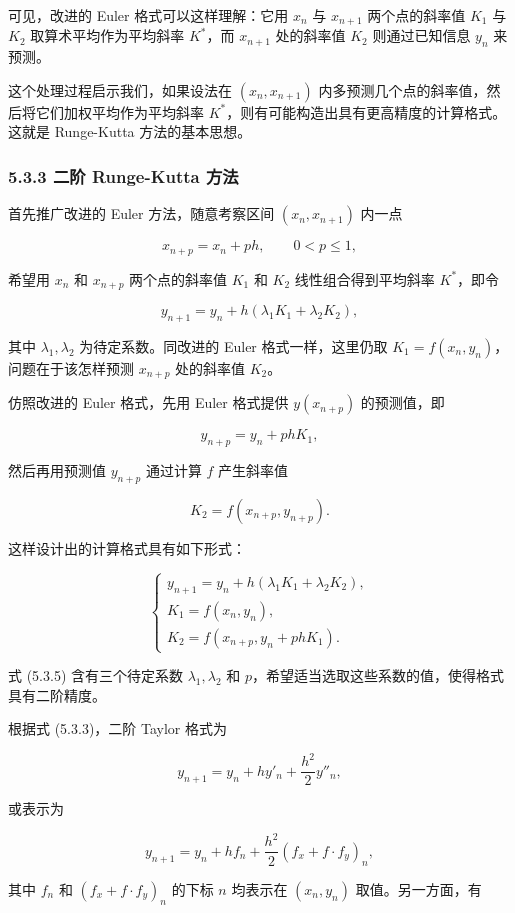 可见，改进的 Euler 格式可以这样理解：它用 \(x_n\) 与 \(x_{n+1}\) 两个点的斜率值 \(K_1\) 与 \(K_2\) 取算术平均作为平均斜率 \(K^*\)，而 \(x_{n+1}\) 处的斜率值 \(K_2\) 则通过已知信息 \(y_n\) 来预测。

这个处理过程启示我们，如果设法在 \((x_n,x_{n+1})\) 内多预测几个点的斜率值，然后将它们加权平均作为平均斜率 \(K^*\)，则有可能构造出具有更高精度的计算格式。这就是 Runge-Kutta 方法的基本思想。

\subsubsection{5.3.3 二阶 Runge-Kutta 方法}\label{ch05a-ux4e8cux9636-runge-kutta-ux65b9ux6cd5}

首先推广改进的 Euler 方法，随意考察区间 \((x_n,x_{n+1})\) 内一点

\[
x_{n+p}=x_n+ph,\qquad 0<p\leqslant1,
\]

希望用 \(x_n\) 和 \(x_{n+p}\) 两个点的斜率值 \(K_1\) 和 \(K_2\) 线性组合得到平均斜率 \(K^*\)，即令

\[
y_{n+1}=y_n+h(\lambda_1K_1+\lambda_2K_2),
\]

其中 \(\lambda_1,\lambda_2\) 为待定系数。同改进的 Euler 格式一样，这里仍取 \(K_1=f(x_n,y_n)\)，问题在于该怎样预测 \(x_{n+p}\) 处的斜率值 \(K_2\)。

仿照改进的 Euler 格式，先用 Euler 格式提供 \(y(x_{n+p})\) 的预测值，即

\[
y_{n+p}=y_n+phK_1,
\]

然后再用预测值 \(y_{n+p}\) 通过计算 \(f\) 产生斜率值

\[
K_2=f(x_{n+p},y_{n+p}).
\]

这样设计出的计算格式具有如下形式：

\[
\begin{cases}
y_{n+1}=y_n+h(\lambda_1K_1+\lambda_2K_2),\\
K_1=f(x_n,y_n),\\
K_2=f(x_{n+p},y_n+phK_1).
\end{cases}\tag{5.3.5}
\]

式 (5.3.5) 含有三个待定系数 \(\lambda_1,\lambda_2\) 和 \(p\)，希望适当选取这些系数的值，使得格式具有二阶精度。

根据式 (5.3.3)，二阶 Taylor 格式为

\[
y_{n+1}=y_n+hy'_n+\frac{h^2}{2}y''_n,
\]

或表示为

\[
y_{n+1}=y_n+hf_n+\frac{h^2}{2}(f_x+f\cdot f_y)_n,
\]

其中 \(f_n\) 和 \((f_x+f\cdot f_y)_n\) 的下标 \(n\) 均表示在 \((x_n,y_n)\) 取值。另一方面，有

